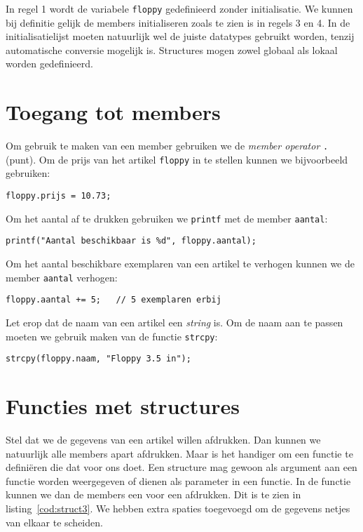 
In regel 1 wordt de variabele \texttt{floppy} gedefinieerd zonder initialisatie. We kunnen bij definitie gelijk de members initialiseren zoals te zien is in regels 3 en 4. In de initialisatielijst moeten natuurlijk wel de juiste datatypes gebruikt worden, tenzij automatische conversie mogelijk is. Structures mogen zowel globaal als lokaal worden gedefinieerd.

\section{Toegang tot members}
Om gebruik te maken van een member gebruiken we de \textsl{member operator} \texttt{.} (punt). Om de prijs van het artikel \texttt{floppy} in te stellen kunnen we bijvoorbeeld gebruiken:

\hspace*{1em}\texttt{floppy.prijs = 10.73;}

Om het aantal af te drukken gebruiken we \texttt{printf} met de member \texttt{aantal}:

\hspace*{1em}\texttt{printf("Aantal beschikbaar is \%d", floppy.aantal);}

Om het aantal beschikbare exemplaren van een artikel te verhogen kunnen we de member \texttt{aantal} verhogen:

\hspace*{1em}\texttt{floppy.aantal += 5; \ \ // 5 exemplaren erbij}

Let erop dat de naam van een artikel een \textsl{string} is. Om de naam aan te passen moeten we gebruik maken van de functie \texttt{strcpy}:

\hspace*{1em}\texttt{strcpy(floppy.naam, "Floppy 3.5 in");}

\section{Functies met structures}
Stel dat we de gegevens van een artikel willen afdrukken. Dan kunnen we natuurlijk alle members apart afdrukken. Maar is het handiger om een functie te definiëren die dat voor ons doet. Een structure mag gewoon als argument aan een functie worden weergegeven of dienen als parameter in een functie. In de functie kunnen we dan de members een voor een afdrukken. Dit is te zien in listing~\ref{cod:struct3}. We hebben extra spaties toegevoegd om de gegevens netjes van elkaar te scheiden.

